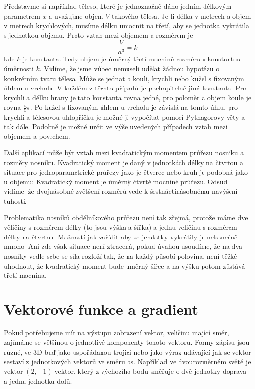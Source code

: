 \documentclass[12pt]{article}
\begin{document}
Představme si například těleso, které je jednoznačně dáno jedním délkovým parametrem $x$ a uvažujme objem $V$ takového tělesa. Je-li délka v metrech a objem v metrech krychlových, musíme délku umocnit na třetí, aby se jednotka vykrátila s jednotkou objemu. Proto vztah mezi objemem a rozměrem je $$\frac{V}{a^3}=k$$
kde $k$ je konstanta. Tedy objem je úměrný třetí mocnině rozměru s konstantou úměrnosti $k$. Vidíme, že jsme vůbec nemuseli udělat žádnou hypotézu o konkrétním tvaru tělesa. Může se jednat o kouli, krychli nebo kužel s fixovaným úhlem u vrcholu. V každém z těchto případů je pochopitelně jiná konstanta. Pro krychli a délku hrany je tato konstanta rovna jedné, pro poloměr a objem koule je rovna $\frac 43 \pi$. Po kužel s fixovaným úhlem u vrcholu je závislá na tomto úhlu, pro krychli a tělesovou uhlopříčku je možné ji vypočítat pomocí Pythagorovy věty a tak dále. Podobně je možné určit ve výše uvedených případech vztah mezi objemem a povrchem.

Další aplikací může být vztah mezi kvadratickým momentem průřezu nosníku a rozměry nosníku. Kvadratický moment je daný v jednotkách délky na čtvrtou a situace pro jednoparametrické průřezy jako je čtverec nebo kruh je podobná jako u objemu: Kvadratický moment je úměrný čtvrté mocnině průřezu. Odsud vidíme, že dvojnásobné zvětšení rozměrů vede k šestnáctinásobnému navýšení tuhosti.

Problematika nosníků obdélníkového průřezu není tak zřejmá, protože máme dve věličiny s rozměrem délky (to jsou výška a šířka) a jednu veličinu s rozměrem délky na čtvrtou. Možností jak zařídit aby se jendotky vykrátily je nekonečně mnoho. Ani zde však situace není ztracená, pokud úvahou usoudíme, že na dva nosníky vedle sebe se síla rozloží tak, že na každý působí polovina, není těžké uhodnout, že kvadratický moment bude úměrný šířce a na výšku potom zůstává třetí mocnina. 


\section*{Vektorové funkce a gradient}

Pokud potřebujeme mít na výstupu zobrazení vektor, veličinu mající směr, zajímáme se většinou o jednotlivé komponenty tohoto vektoru. Formy zápisu jsou různé, ve 3D buď jako uspořádanou trojici nebo jako výraz udávající jak se vektor sestaví z jednotkových vektorů ve směru os. Například ve dvourozměrném světě je vektor $(2,-1)$ vektor, který z výchozího bodu směřuje o dvě jednotky doprava a jednu jednotku dolů.
\end{document}

